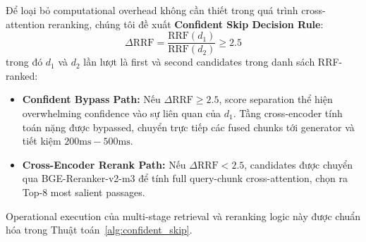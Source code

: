 \documentclass[10pt]{SPIIRAS_Proceedings}
\begin{document}
Để loại bỏ computational overhead không cần thiết trong quá trình cross-attention reranking, chúng tôi đề xuất \textbf{Confident Skip Decision Rule}:
\begin{equation}
\Delta \text{RRF} = \frac{\text{RRF}(d_1)}{\text{RRF}(d_2)} \ge 2.5
\end{equation}
trong đó $d_1$ và $d_2$ lần lượt là first và second candidates trong danh sách RRF-ranked:
\begin{itemize}
    \item \textbf{Confident Bypass Path:} Nếu $\Delta \text{RRF} \ge 2.5$, score separation thể hiện overwhelming confidence vào sự liên quan của $d_1$. Tầng cross-encoder tính toán nặng được bypassed, chuyển trực tiếp các fused chunks tới generator và tiết kiệm $200\text{ms}-500\text{ms}$.
    \item \textbf{Cross-Encoder Rerank Path:} Nếu $\Delta \text{RRF} < 2.5$, candidates được chuyển qua BGE-Reranker-v2-m3 \cite{xiao2023cpack} để tính full query-chunk cross-attention, chọn ra Top-8 most salient passages.
\end{itemize}

Operational execution của multi-stage retrieval và reranking logic này được chuẩn hóa trong Thuật toán~\ref{alg:confident_skip}.
\end{document}
